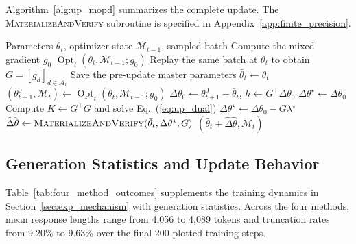 \documentclass{article}
\begin{document}
Algorithm~\ref{alg:up_mopd} summarizes the complete update. The
\textsc{MaterializeAndVerify} subroutine is specified in
Appendix~\ref{app:finite_precision}.

\begin{algorithm}[H]
\caption{One training step of UP-MOPD}
\label{alg:up_mopd}
\small
\begin{algorithmic}[1]
\Require Parameters $\theta_t$, optimizer state $\mathcal M_{t-1}$, sampled batch
\State Compute the mixed gradient $g_0$
    \State \Return $\operatorname{Opt}_t(\theta_t,\mathcal M_{t-1};g_0)$
\EndIf
\State Replay the same batch at $\theta_t$ to obtain $G=[g_d]_{d\in\mathcal A_t}$
\State Save the pre-update master parameters $\bar\theta_t\gets\theta_t$
\State $(\theta_{t+1}^{0},\mathcal M_t)\gets
       \operatorname{Opt}_t(\theta_t,\mathcal M_{t-1};g_0)$
\State $\Delta\theta_0\gets\theta_{t+1}^{0}-\bar\theta_t$,
       $h\gets G^\top\Delta\theta_0$
\State $\Delta\theta^\star\gets\Delta\theta_0$
    \State Compute $K\gets G^\top G$ and solve Eq.~(\ref{eq:up_dual})
    \State $\Delta\theta^\star\gets\Delta\theta_0-G\lambda^\star$
\EndIf
\State $\widehat{\Delta\theta}\gets
       \Call{MaterializeAndVerify}{\bar\theta_t,\Delta\theta^\star,G}$
\State \Return $(\bar\theta_t+\widehat{\Delta\theta},\mathcal M_t)$
\end{algorithmic}
\end{algorithm}

\subsection{Generation Statistics and Update Behavior}
\label{app:four_method_dynamics}

Table~\ref{tab:four_method_outcomes} supplements the training dynamics
in Section~\ref{sec:exp_mechanism} with generation statistics.
Across the four methods, mean response lengths range from 4,056 to
4,089 tokens and truncation rates from 9.20\% to 9.63\% over the final
200 plotted training steps.
\end{document}
